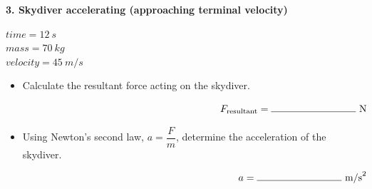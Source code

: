 \documentclass[12pt]{article}
\begin{document}
\noindent
\begin{minipage}[t]{0.48\textwidth}

\textbf{3. Skydiver accelerating (approaching terminal velocity)}

\vspace{0.5cm}
$time = \SI{12}{s}$ \\
$mass = \SI{70}{kg}$ \\
$velocity = \SI{45}{m/s}$ \\

\vspace{0.5cm}

\begin{center}
\end{center}

\end{minipage}
\hfill
\begin{minipage}[t]{0.48\textwidth}

\begin{itemize}[label={}, leftmargin=*]
    \item Calculate the resultant force acting on the skydiver.

    \vspace{2.0cm}
    \[
    \makebox[\linewidth][r]{$F_{\text{resultant}} = \rule{3cm}{0.4pt}\ \text{N}$}
    \]

    \item Using Newton’s second law, $a = \dfrac{F}{m}$, determine the acceleration of the skydiver.

    \vspace{2.0cm}
    \[
    \makebox[\linewidth][r]{$a = \rule{3cm}{0.4pt}\ \text{m/s}^{2}$}
    \]
\end{itemize}

\end{minipage}

\vspace{1.2cm}
\end{document}
